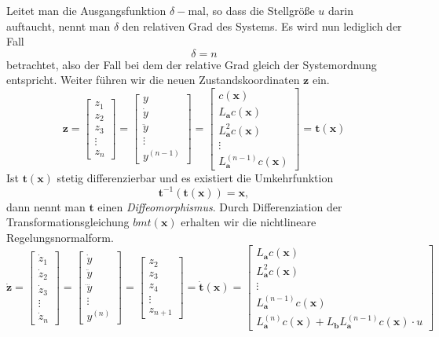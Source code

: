 			Leitet man die Ausgangsfunktion $ \delta- $mal, so dass die Stellgröße $ u $ darin auftaucht, nennt man $ \delta $ den relativen Grad des Systems. Es wird nun lediglich der Fall
			\[\delta = n\]
			betrachtet, also der Fall bei dem der relative Grad gleich der Systemordnung entspricht.
			Weiter führen wir die neuen Zustandskoordinaten $ \bm{z} $ ein.
			\[\bm{z}=\begin{bmatrix}z_{1}\\z_{2}\\z_{3}\\\vdots\\ z_{n}\end{bmatrix} = 
			\begin{bmatrix}y\\\dot{y}\\\ddot{y}\\\vdots\\ y^{(n-1)}\end{bmatrix} =
			\begin{bmatrix}c(\bm{x})\\L_{\bm{a}}c(\bm{x})\\L_{\bm{a}}^{2}c(\bm{x})\\\vdots\\ L_{\bm{a}}^{(n-1)}c(\bm{x})\end{bmatrix} = \bm{t}(\bm{x})\]
			Ist $ \bm{t}(\bm{x}) $ stetig differenzierbar und es existiert die Umkehrfunktion 
			\[\bm{t}^{-1}(\bm{t}(\bm{x}))=\bm{x},\]
			dann nennt man $ \bm{t} $ einen \textit{Diffeomorphismus}. Durch Differenziation der Transformationsgleichung $ bm{t}(\bm{x}) $ erhalten wir die nichtlineare Regelungsnormalform.
			\[\bm{\dot{z}}=\begin{bmatrix}\dot{z}_{1}\\\dot{z}_{2}\\\dot{z}_{3}\\\vdots\\ \dot{z}_{n}\end{bmatrix} = \begin{bmatrix}\dot{y}\\\ddot{y}\\\dddot{y}\\\vdots\\ y^{(n)}\end{bmatrix} = \begin{bmatrix}z_{2}\\z_{3}\\z_{4}\\\vdots\\ z_{n+1}\end{bmatrix} =\bm{\dot{t}}(\bm{x}) = \begin{bmatrix}L_{\bm{a}}c(\bm{x})\\L_{\bm{a}}^{2}c(\bm{x})\\\vdots\\ L_{\bm{a}}^{(n-1)}c(\bm{x})\\ L_{\bm{a}}^{(n)}c(\bm{x}) + L_{\bm{b}}L_{\bm{a}}^{(n-1)}c(\bm{x})\cdot u\end{bmatrix}\]
